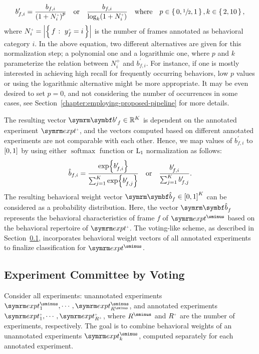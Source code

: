 \begin{equation}
	b^\prime_{f,i} = \frac{b_{f,i}}{\rbr{1 + N^{\plus}_i}^p} \qbor \frac{b_{f,i}}{\log_k(1 + N^{\plus}_i)} \qbwhere p \in \set{0, \sfrac{1}{2}, 1}, k \in \set{2, 10},
\end{equation}
where $N^{\plus}_i = \card*{\Set{f}{y^{\plus}_f=i}}$ is the number of frames annotated as behavioral category $i$.
In the above equation, two different alternatives are given for this normalization step; a polynomial one and a logarithmic one, where $p$ and $k$ parameterize the relation between $N^{\plus}_i$ and $b^\prime_{f,i}$.
For instance, if one is mostly interested in achieving high recall for frequently occurring behaviors, low $p$ values or using the logarithmic alternative might be more appropriate.
It may be even desired to set $p=0$, and not considering the number of occurrences in some cases, see Section~\ref{chapter:employing-proposed-pipeline} for more details.

The resulting vector $\V{b^{\prime}}_f \in \reals^K$ is dependent on the annotated experiment $\exptAnn$, and the vectors computed based on different annotated experiments are not comparable with each other.
Hence, we map values of $b^\prime_{f,i}$ to $\left[0,1\right]$ by using either $\operatorname {softmax}$ function or $\textnormal{L}_1$ normalization as follows:
\begin{equation}
	\hat{b}_{f,i} = \frac{\exp{b^\prime_{f,i}}}{\sum_{j=1}^{K} \exp{b^\prime_{f,j}}} \quad \textnormal{or} \quad \frac{b^\prime_{f,i}}{\sum_{j=1}^{K} b^\prime_{f,j}}.
\end{equation}
The resulting behavioral weight vector $\V{\hat{b}}_f \in \sqbr{0,1}^K$ can be considered as a probability distribution.
Here, the vector $\V{\hat{b}}_f$ represents the behavioral characteristics of frame $f$ of $\exptUnann$ based on the behavioral repertoire of $\exptAnn$.
The voting-like scheme, as described in Section~\ref{section:committee-voting}, incorporates behavioral weight vectors of all annotated experiments to finalize classification for $\exptUnann$.

\subsection{Experiment Committee by Voting}\label{section:committee-voting}
Consider all experiments: unannotated experiments $\exptUnann_1, \cdots, \exptUnann_{\Unann{R}}$, and annotated experiments $\exptAnn_1, \cdots, \exptAnn_{\Ann{R}}$, where $\Unann{R}$ and $\Ann{R}$ are the number of experiments, respectively.
The goal is to combine behavioral weights of an unannotated experiments $\exptUnann_k$, computed separately for each annotated experiment.


